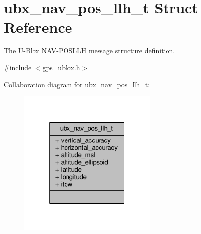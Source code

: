 \hypertarget{structubx__nav__pos__llh__t}{\section{ubx\+\_\+nav\+\_\+pos\+\_\+llh\+\_\+t Struct Reference}
\label{structubx__nav__pos__llh__t}
}


The U-\/\+Blox N\+A\+V-\/\+P\+O\+S\+L\+L\+H message structure definition.  




{\ttfamily \#include $<$gps\+\_\+ublox.\+h$>$}



Collaboration diagram for ubx\+\_\+nav\+\_\+pos\+\_\+llh\+\_\+t\+:
\nopagebreak
\begin{figure}[H]
\begin{center}
\leavevmode
\includegraphics[width=193pt]{structubx__nav__pos__llh__t__coll__graph}
\end{center}
\end{figure}
